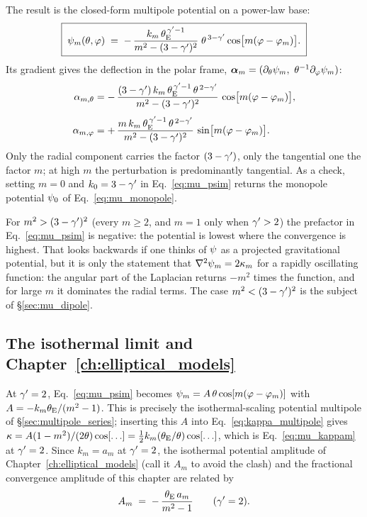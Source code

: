 The result is the closed-form multipole potential on a power-law base:
\begin{equation}
    \boxed{\;
    \psi_m(\theta,\varphi) \;=\;
    -\,\frac{k_m\,\theta_{\mathrm{E}}^{\,\gamma'-1}}{m^{2}-(3-\gamma')^{2}}\;
    \theta^{\,3-\gamma'}\cos\!\big[m(\varphi-\varphi_m)\big] .
    \;}
    \label{eq:mu_psim}
\end{equation}
Its gradient gives the deflection in the polar frame,
$\boldsymbol{\alpha}_m = (\partial_\theta\psi_m,\ \theta^{-1}\partial_\varphi\psi_m)$:
\begin{align}
    \alpha_{m,\theta} &=
    -\,\frac{(3-\gamma')\,k_m\,\theta_{\mathrm{E}}^{\,\gamma'-1}\,\theta^{\,2-\gamma'}}{m^{2}-(3-\gamma')^{2}}\,
    \cos\!\big[m(\varphi-\varphi_m)\big],
    \label{eq:mu_alphar}\\[3pt]
    \alpha_{m,\varphi} &=
    +\,\frac{m\,k_m\,\theta_{\mathrm{E}}^{\,\gamma'-1}\,\theta^{\,2-\gamma'}}{m^{2}-(3-\gamma')^{2}}\,
    \sin\!\big[m(\varphi-\varphi_m)\big].
    \label{eq:mu_alphaphi}
\end{align}
Only the radial component carries the factor $(3-\gamma')$, only the
tangential one the factor $m$; at high $m$ the perturbation is
predominantly tangential.  As a check, setting $m=0$ and
$k_0 = 3-\gamma'$ in Eq.~\eqref{eq:mu_psim} returns the monopole
potential $\psi_0$ of Eq.~\eqref{eq:mu_monopole}.

\begin{annotation}
For $m^2>(3-\gamma')^2$ (every $m\ge2$, and $m=1$ only when $\gamma'>2$) the
prefactor in Eq.~\eqref{eq:mu_psim} is negative: the potential is
lowest where the convergence is highest.  That looks
backwards if one thinks of $\psi$ as a projected gravitational
potential, but it is only the statement that $\nabla^2\psi_m =
2\kappa_m$ for a rapidly oscillating function: the angular part of
the Laplacian returns $-m^2$ times the function, and for large $m$ it
dominates the radial terms.  The case $m^2<(3-\gamma')^2$ is the subject
of \S\ref{sec:mu_dipole}.
\end{annotation}

\subsection{The isothermal limit and Chapter~\ref{ch:elliptical_models}}
\label{sec:mu_isothermal_limit}

At $\gamma'=2$, Eq.~\eqref{eq:mu_psim} becomes
$\psi_m = A\,\theta\cos[m(\varphi-\varphi_m)]$ with
$A = -k_m\theta_{\mathrm{E}}/(m^2-1)$.  This is precisely the isothermal-scaling
potential multipole of \S\ref{sec:multipole_series}; inserting this $A$
into Eq.~\eqref{eq:kappa_multipole} gives
$\kappa = A(1-m^2)/(2\theta)\cos[\ldots] = \tfrac12 k_m(\theta_{\mathrm{E}}/\theta)
\cos[\ldots]$, which is Eq.~\eqref{eq:mu_kappam} at $\gamma'=2$.  Since
$k_m = a_m$ at $\gamma'=2$, the isothermal potential amplitude of
Chapter~\ref{ch:elliptical_models} (call it $A_m$ to avoid the clash)
and the fractional convergence amplitude of this chapter are related by
\begin{equation}
    A_m \;=\; -\,\frac{\theta_{\mathrm{E}}\,a_m}{m^2-1}
    \qquad(\gamma'=2).
    \label{eq:mu_iso_dictionary}
\end{equation}

